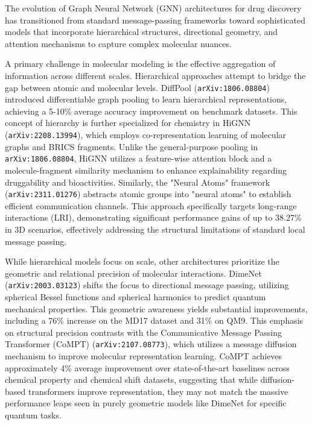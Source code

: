 \documentclass[11pt]{article}
\begin{document}
The evolution of Graph Neural Network (GNN) architectures for drug discovery has transitioned from standard message-passing frameworks toward sophisticated models that incorporate hierarchical structures, directional geometry, and attention mechanisms to capture complex molecular nuances.

A primary challenge in molecular modeling is the effective aggregation of information across different scales. Hierarchical approaches attempt to bridge the gap between atomic and molecular levels. DiffPool (\texttt{arXiv:1806.08804}) introduced differentiable graph pooling to learn hierarchical representations, achieving a 5-10\% average accuracy improvement on benchmark datasets. This concept of hierarchy is further specialized for chemistry in HiGNN (\texttt{arXiv:2208.13994}), which employs co-representation learning of molecular graphs and BRICS fragments. Unlike the general-purpose pooling in \texttt{arXiv:1806.08804}, HiGNN utilizes a feature-wise attention block and a molecule-fragment similarity mechanism to enhance explainability regarding druggability and bioactivities. Similarly, the "Neural Atoms" framework (\texttt{arXiv:2311.01276}) abstracts atomic groups into "neural atoms" to establish efficient communication channels. This approach specifically targets long-range interactions (LRI), demonstrating significant performance gains of up to 38.27\% in 3D scenarios, effectively addressing the structural limitations of standard local message passing.

While hierarchical models focus on scale, other architectures prioritize the geometric and relational precision of molecular interactions. DimeNet (\texttt{arXiv:2003.03123}) shifts the focus to directional message passing, utilizing spherical Bessel functions and spherical harmonics to predict quantum mechanical properties. This geometric awareness yields substantial improvements, including a 76\% increase on the MD17 dataset and 31\% on QM9. This emphasis on structural precision contrasts with the Communicative Message Passing Transformer (CoMPT) (\texttt{arXiv:2107.08773}), which utilizes a message diffusion mechanism to improve molecular representation learning. CoMPT achieves approximately 4\% average improvement over state-of-the-art baselines across chemical property and chemical shift datasets, suggesting that while diffusion-based transformers improve representation, they may not match the massive performance leaps seen in purely geometric models like DimeNet for specific quantum tasks.
\end{document}
